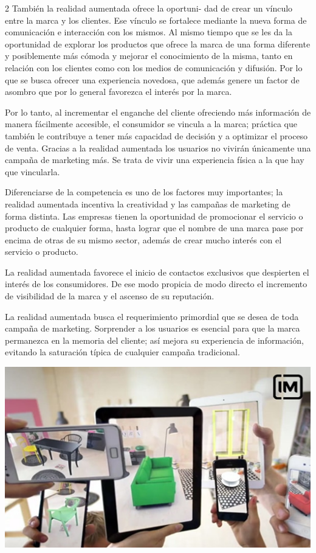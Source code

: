 \documentclass[12pt,spanish,Letterpaper,openany]{book}
\begin{document}
\begin {multicols}{2}
También la realidad aumentada ofrece la oportuni-
dad de crear un vínculo entre la marca y los clientes. Ese vínculo se fortalece mediante la nueva forma de comunicación e interacción con los mismos. Al mismo tiempo que se les da la oportunidad de explorar los productos que ofrece la marca de una forma diferente y posiblemente más cómoda y mejorar el conocimiento de la misma, tanto en relación con los clientes como con los medios de comunicación y difusión. Por lo que se busca ofrecer una experiencia novedosa, que además genere un factor de asombro que por lo general favorezca el interés por la marca.

Por lo tanto, al incrementar el enganche del cliente ofreciendo más información de manera fácilmente accesible, el consumidor se vincula a la marca; práctica que también le contribuye a tener más capacidad de decisión y a optimizar el proceso de venta. Gracias a la realidad aumentada los usuarios no vivirán únicamente una campaña de marketing más. Se trata de vivir una experiencia física a la que hay que vincularla.

Diferenciarse de la competencia es uno de los factores muy importantes; la realidad aumentada incentiva la creatividad y las campañas de marketing de forma distinta. Las empresas tienen la oportunidad de promocionar el servicio o producto de cualquier forma, hasta lograr que el nombre de una marca pase por encima de otras de su mismo sector, además de crear mucho interés con el servicio o producto.

La realidad aumentada favorece el inicio de contactos exclusivos que despierten el interés de los consumidores. De ese modo propicia de modo directo el incremento de visibilidad de la marca y el ascenso de su reputación.

La realidad aumentada busca el requerimiento primordial que se desea de toda campaña de marketing. Sorprender a los usuarios es esencial para que la marca permanezca en la memoria del cliente; así mejora su experiencia de información, evitando la saturación típica de cualquier campaña tradicional.

\begin {flushleft}
\noindent\begin{minipage}[c]{\columnwidth}

\includegraphics[width=1\linewidth]{images/ramiro_01}


\end{minipage}
\end{flushleft}
\end{multicols}
\end{document}
